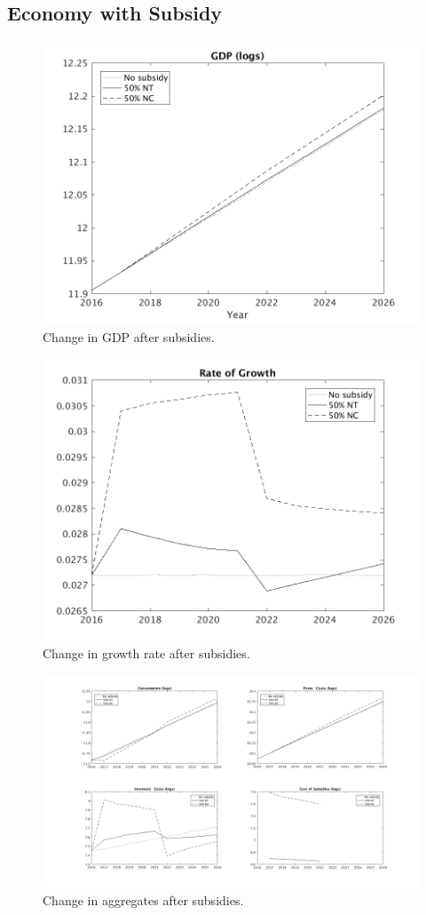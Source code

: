 \documentclass[serif]{article}
\theoremstyle{definition}
\begin{document}
\clearpage

\subsection*{Economy with Subsidy}

\begin{figure}[h!]
\centering
\includegraphics[width=.7\textwidth]{figures/5_years/gdp_subs.png}
\caption{Change in GDP after subsidies.}
\end{figure}

\begin{figure}[h!]
\centering
\includegraphics[width=.7\textwidth]{figures/5_years/growth_subs.png}
\caption{Change in growth rate after subsidies.}
\end{figure}

\begin{figure}[h!]
\centering
\includegraphics[width=\textwidth]{figures/5_years/aggregates_subs.png}
\caption{Change in aggregates after subsidies.}
\end{figure}
\end{document}
